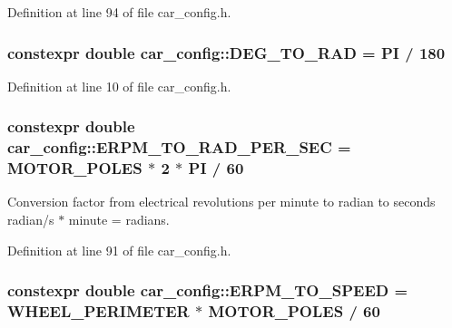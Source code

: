 Definition at line 94 of file car\+\_\+config.\+h.

\subsubsection[{\texorpdfstring{D\+E\+G\+\_\+\+T\+O\+\_\+\+R\+AD}{DEG_TO_RAD}}]{\setlength{\rightskip}{0pt plus 5cm}constexpr double car\+\_\+config\+::\+D\+E\+G\+\_\+\+T\+O\+\_\+\+R\+AD = {\bf PI} / 180}\hypertarget{namespacecar__config_a72deaa1a555d694e52fb768ffba1d8cb}{}\label{namespacecar__config_a72deaa1a555d694e52fb768ffba1d8cb}


Definition at line 10 of file car\+\_\+config.\+h.

\subsubsection[{\texorpdfstring{E\+R\+P\+M\+\_\+\+T\+O\+\_\+\+R\+A\+D\+\_\+\+P\+E\+R\+\_\+\+S\+EC}{ERPM_TO_RAD_PER_SEC}}]{\setlength{\rightskip}{0pt plus 5cm}constexpr double car\+\_\+config\+::\+E\+R\+P\+M\+\_\+\+T\+O\+\_\+\+R\+A\+D\+\_\+\+P\+E\+R\+\_\+\+S\+EC = {\bf M\+O\+T\+O\+R\+\_\+\+P\+O\+L\+ES} $\ast$ 2 $\ast$ {\bf PI} / 60}\hypertarget{namespacecar__config_a877c4a772a47f4737d9f03fe8a22e106}{}\label{namespacecar__config_a877c4a772a47f4737d9f03fe8a22e106}


Conversion factor from electrical revolutions per minute to radian to seconds  radian/s $\ast$ minute = radians. 



Definition at line 91 of file car\+\_\+config.\+h.

\subsubsection[{\texorpdfstring{E\+R\+P\+M\+\_\+\+T\+O\+\_\+\+S\+P\+E\+ED}{ERPM_TO_SPEED}}]{\setlength{\rightskip}{0pt plus 5cm}constexpr double car\+\_\+config\+::\+E\+R\+P\+M\+\_\+\+T\+O\+\_\+\+S\+P\+E\+ED = {\bf W\+H\+E\+E\+L\+\_\+\+P\+E\+R\+I\+M\+E\+T\+ER} $\ast$ {\bf M\+O\+T\+O\+R\+\_\+\+P\+O\+L\+ES} / 60}\hypertarget{namespacecar__config_af33b95798967e7193927782fd91d36ce}{}\label{namespacecar__config_af33b95798967e7193927782fd91d36ce}


